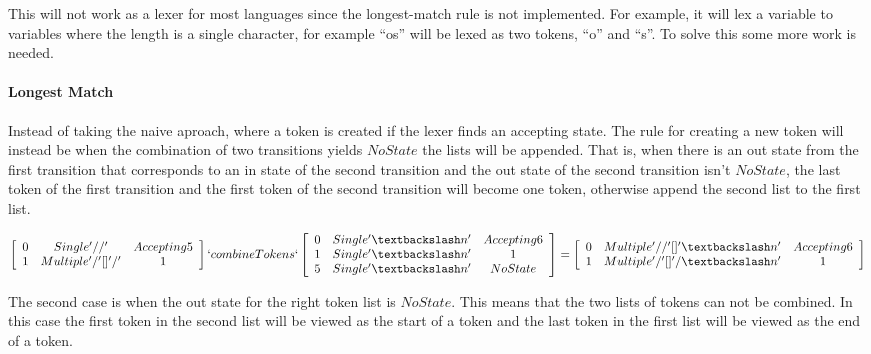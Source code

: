 This will not work as a lexer for most languages since the longest-match rule is
not implemented. For example, it will lex a variable to variables where the
length is a single character, for example ``os'' will be lexed as two tokens,
``o'' and ``s''. To solve this some more work is needed.

\paragraph{Longest Match}\label{longmatch}
Instead of taking the naive aproach, where a token is created if the lexer finds an
accepting state. The rule for creating a new token will instead be when the
combination of two transitions yields $NoState$ the lists will be appended. That
is, when there is an out state from the first transition that corresponds to an
in state of the second transition and the out state of the second transition
isn't $NoState$, the last token of the first transition and the first token of
the second transition will become one token, otherwise append the second list to
the first list.
\begin{center}
$\left[\begin{array}{ccc}
0&Single '//'& Accepting 5\\
1&Multiple '/' [] '/' &1\\
\end{array}\right] `combineTokens` 
\left[\begin{array}{ccc}
0&Single '\textbackslash n'&Accepting 6\\
1&Single '\textbackslash n'&1\\
5&Single '\textbackslash n'&NoState\\
\end{array}\right] =
\left[\begin{array}{ccc}
0&Multiple '//' [] '\textbackslash n'&Accepting 6\\
1&Multiple '/' [] '/\textbackslash n'&1\\
\end{array}\right]$
\end{center}
The second case is when the out state for the right token list is $NoState$.
This means that the two lists of tokens can not be combined. In this case the
first token in the second list will be viewed as the start of a token and the
last token in the first list will be viewed as the end of a token.                                                                                               

